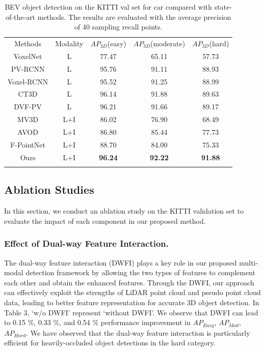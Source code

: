 \begin{sloppypar}
\begin{table}[!t]
\renewcommand{\arraystretch}{1.3}
\setlength\tabcolsep{28pt}%
\caption{BEV object detection on the KITTI val set for car compared with state-of-the-art methods. The results are evaluated with the average precision of 40 sampling recall points.}
\label{table1}
\centering
\begin{tabular*}{\linewidth}{ccccc}
\hline\noalign{\smallskip}
Methods & Modality & $AP_{3D}$(easy) & $AP_{3D}$(moderate) & $AP_{3D}$(hard) \\
\noalign{\smallskip}\hline\noalign{\smallskip}
VoxelNet\cite{19} & L & 77.47 & 65.11 & 57.73\\
PV-RCNN\cite{4} & L & 95.76 & 91.11 & 88.93 \\
Voxel-RCNN\cite{21} & L & 95.52  & 91.25 & 88.99 \\
CT3D\cite{2} & L & 96.14 & 91.88 & 89.63 \\
DVF-PV\cite{32} & L & 96.21 & 91.66 & 89.17 \\
MV3D\cite{12} & L+I & 86.02 & 76.90 & 68.49 \\
AVOD\cite{13} & L+I & 86.80 & 85.44 & 77.73 \\
F-PointNet\cite{10} & L+I & 88.70 & 84.00 & 75.33 \\
Ours &L+I & \bf{96.24} & \bf{92.22} & \bf{91.88}\\
\noalign{\smallskip}\hline
\end{tabular*}
\end{table}


\subsection{Ablation Studies}
In this section, we conduct an ablation study on the KITTI validation set to evaluate the impact of each component in our proposed method. 
\subsubsection{Effect of Dual-way Feature Interaction.}
The dual-way feature interaction (DWFI) plays a key role in our proposed multi-modal detection framework by allowing the two types of features to complement each other and obtain the enhanced features. Through the DWFI, our approach can effectively exploit the strengths of LiDAR point cloud and pseudo point cloud data, leading to better feature representation for accurate 3D object detection. In Table 3, ‘w/o DWFI’ represent  ‘without DWFI’. We observe that DWFI can lead to 0.15 $\%$, 0.33 $\%$, and 0.54 $\%$ performance improvement in $AP_{Easy}$,  $AP_{Mod}$, $AP_{Hard}$. We have observed that the dual-way feature interaction is particularly efficient for heavily-occluded object detections in the hard category.

\end{sloppypar}
